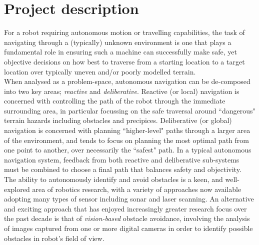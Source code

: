 \documentclass[10pt,fleqn,twoside]{article}
\begin{document}
\wordcount{}

\mmp

\setcounter{tocdepth}{3} %


\section{Project description}

For a robot requiring autonomous motion or travelling capabilities, the task of navigating through a (typically) unknown environment is one that plays a fundamental role in ensuring such a machine can successfully make safe, yet objective decisions on how best to traverse from a starting location to a target location over typically uneven and/or poorly modelled terrain. \\

When analysed as a problem-space, autonomous navigation can be de-composed into two key areas; \textit{reactive} and \textit{deliberative}. Reactive (or local) navigation is concerned with controlling the path of the robot through the immediate surrounding area, in particular focussing on the safe traversal around ``dangerous" terrain hazards including obstacles and precipices. Deliberative (or global) navigation is concerned with planning ``higher-level" paths through a larger area of the environment, and tends to focus on planning the most optimal path from one point to another, over necessarily the ``safest" path. In a typical autonomous navigation system, feedback from both reactive and deliberative sub-systems must be combined to choose a final path that balances safety and objectivity. \\

The ability to autonomously identify and avoid obstacles is a keen, and well-explored area of robotics research, with a variety of approaches now available adopting many types of sensor including sonar and laser scanning. An alternative and exciting approach that has enjoyed increasingly greater research focus over the past decade is that of \textit{vision-based} obstacle avoidance, involving the analysis of images captured from one or more digital cameras in order to identify possible obstacles in robot's field of view. \\
\end{document}
